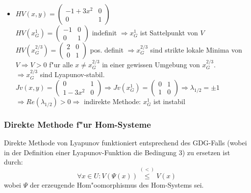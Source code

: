 \documentclass[a4paper, 13pt]{scrreprt}
\theoremstyle{definition} \newtheorem{definition}{Definition}[section]
\newenvironment{beispiel}[1][Beispiel]{\begin{trivlist}
\item[\hskip \labelsep {\bfseries #1}]}{\end{trivlist}}
\begin{document}
\begin{beispiel}
\begin{itemize}
\begin{itemize}
			\item \(HV(x,y) = \left(\begin{array}{cc} -1+3x^2 & 0 \\ 0 & 1 \end{array}\right) \) \\
						\(HV(x_G^1) = \left(\begin{array}{cc} -1 & 0 \\ 0 & 1 \end{array} \right)\) indefinit \(\Rightarrow x_G^1\) ist Sattelpunkt von \(V\) \\
						\(HV(x_G^{2/3}) = \left(\begin{array}{cc} 2 & 0 \\ 0 & 1 \end{array}\right) \) pos. definit \(\Rightarrow x_G^{2/3} \) sind strikte lokale Minima von \(V \Rightarrow V > 0\) f"ur alle \( x \not= x_G^{2/3}\) in einer gewissen Umgebung von \(x_G^{2/3}\).\\
						\(\Rightarrow x_G^{2/3} \) sind Lyapunov-stabil.\\
						\(Jv(x,y) = \left( \begin{array}{cc} 0 & 1 \\ 1-3x^2 & 0 \end{array}\right)
						\Rightarrow Jv(x_G^1) = \left( \begin{array}{cc} 0 & 1 \\ 1 & 0 \end{array}\right) \Rightarrow \lambda_{1/2} = \pm 1 \) \\
						\( \Rightarrow Re(\lambda_{1/2}) > 0 \Rightarrow \) indirekte Methode: \(x_G^1\) ist instabil
			\end{itemize}
	
\end{itemize}
\end{beispiel}

\subsubsection{Direkte Methode f"ur Hom-Systeme} 
Direkte Methode von Lyapunov funktioniert entsprechend des GDG-Falls (wobei in der Definition einer Lyapunov-Funktion die Bedingung 3) zu ersetzen ist durch: 
	\[\forall x \in U: V(\Psi(x)) \stackrel{(<)} \leq V(x)\  \]
wobei \(\Psi\) der erzeugende Hom"oomorphismus des Hom-Systems sei.


\end{document}
